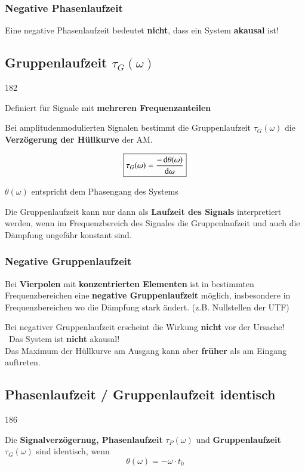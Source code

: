 \subsubsection{Negative Phasenlaufzeit}

Eine negative Phasenlaufzeit bedeutet \textbf{nicht}, dass ein System \textbf{akausal} ist!


\subsection{Gruppenlaufzeit \texorpdfstring{$\tau_G(\omega)$}{tG(w)} }{182}

Definiert für Signale mit \textbf{mehreren Frequenzanteilen}\medskip

Bei amplitudenmodulierten Signalen bestimmt die Gruppenlaufzeit $\tau_G(\omega)$ die \textbf{Verzögerung der Hüllkurve} der AM.

$$ \boxed{ \tau_G(\omega) = \frac{-\mathop{} \! \mathrm{d} \theta(\omega)}{\mathop{} \! \mathrm{d} \omega} } $$

$\theta(\omega)$ entspricht dem Phasengang des Systems\medskip

Die Gruppenlaufzeit kann nur dann als \textbf{Laufzeit des Signals} interpretiert werden, wenn im Frequenzbereich des Signales 
die Gruppenlaufzeit und auch die Dämpfung ungefähr konstant sind.


\subsubsection{Negative Gruppenlaufzeit}

Bei \textbf{Vierpolen} mit \textbf{konzentrierten Elementen} ist in bestimmten Frequenzbereichen eine 
\textbf{negative Gruppenlaufzeit} möglich, insbesondere in Frequenzbereichen wo die Dämpfung stark ändert.
(z.B. Nullstellen der UTF) 

Bei negativer Gruppenlaufzeit erscheint die Wirkung \textbf{nicht} vor der Ursache! \\
\textrightarrow\ Das System ist \textbf{nicht} akausal! \\
Das Maximum der Hüllkurve am Ausgang kann aber \textbf{früher} als am Eingang auftreten.


\subsection{Phasenlaufzeit / Gruppenlaufzeit identisch}{186}\label{Phasenlaufzeit / Gruppenlaufzeit identisch}

Die \textbf{Signalverzögernug, Phasenlaufzeit} $\tau_P(\omega)$ und \textbf{Gruppenlaufzeit} 
$\tau_G(\omega)$ sind identisch, wenn
$$ \boxed{ \theta(\omega) = - \omega \cdot t_0  } $$

